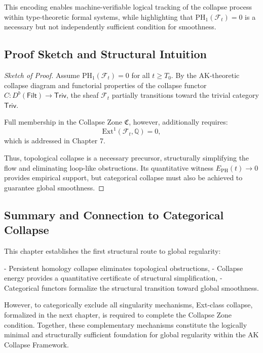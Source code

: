 \documentclass[11pt]{article}
\begin{document}
This encoding enables machine-verifiable logical tracking of the collapse process within type-theoretic formal systems, while highlighting that \( \mathrm{PH}_1(\mathcal{F}_t) = 0 \) is a necessary but not independently sufficient condition for smoothness.

\subsection{Proof Sketch and Structural Intuition}

\begin{proof}[Sketch of Proof]
Assume \( \mathrm{PH}_1(\mathcal{F}_t) = 0 \) for all \( t \geq T_0 \). By the AK-theoretic collapse diagram and functorial properties of the collapse functor \( C: D^b(\mathsf{Filt}) \to \mathsf{Triv} \), the sheaf \( \mathcal{F}_t \) partially transitions toward the trivial category \( \mathsf{Triv} \).

Full membership in the Collapse Zone \( \mathfrak{C} \), however, additionally requires:
\[
\mathrm{Ext}^1(\mathcal{F}_t, \mathbb{Q}) = 0,
\]
which is addressed in Chapter 7.

Thus, topological collapse is a necessary precursor, structurally simplifying the flow and eliminating loop-like obstructions. Its quantitative witness \( E_{\mathrm{PH}}(t) \to 0 \) provides empirical support, but categorical collapse must also be achieved to guarantee global smoothness.
\end{proof}

\subsection{Summary and Connection to Categorical Collapse}

This chapter establishes the first structural route to global regularity:

- Persistent homology collapse eliminates topological obstructions,
- Collapse energy provides a quantitative certificate of structural simplification,
- Categorical functors formalize the structural transition toward global smoothness.

However, to categorically exclude all singularity mechanisms, Ext-class collapse, formalized in the next chapter, is required to complete the Collapse Zone condition. Together, these complementary mechanisms constitute the logically minimal and structurally sufficient foundation for global regularity within the AK Collapse Framework.
\end{document}
